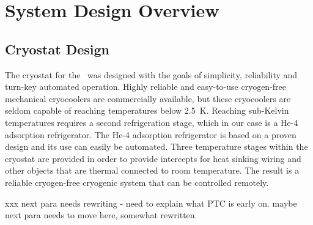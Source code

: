 \chapter{System Design Overview}\label{c:sys-design}

\section{Cryostat Design}\label{s-cryo-design}

The cryostat for the \Imager\ was designed with the goals of simplicity, reliability and turn-key automated operation.
Highly reliable and easy-to-use cryogen-free mechanical cryocoolers are commercially available, but these cryocoolers are seldom capable of reaching temperatures below 2.5~K.
Reaching sub-Kelvin temperatures requires a second refrigeration stage, which in our case is a He-4 adsorption refrigerator.
The He-4 adsorption refrigerator is based on a proven design and its use can easily be automated.
Three temperature stages within the cryostat are provided in order to provide intercepts for heat sinking wiring and other objects that are thermal connected to room temperature. 
The result is a reliable cryogen-free cryogenic system that can be controlled remotely.

xxx next para needs rewriting - need to explain what PTC is early on. maybe next para needs to move here, somewhat rewritten.

